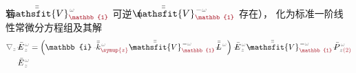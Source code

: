 若 $\Xint{\mathcolor{gray}{-}}{25}{\bar{\bar{\mathsfit{V}}}}^{\;\! \mathcolor{gray}{\omega}}_{\textcolor{Maroon}{\mathbb{1}}}$ 可逆（ $\Xint{\mathcolor{gray}{-}}{25}{\bar{\bar{\mathsfit{V}}}}^{\;\! - \mathcolor{gray}{\omega}}_{\textcolor{Maroon}{\mathbb{1}}}$ 存在）， 化为标准一阶线性常微分方程组及其解
\begin{align}
	\mathcolor{gray}{\nabla_z} \Xint{\mathcolor{gray}{-}}{295}{\bar{E}}^{\;\!\mathcolor{gray}{\omega}}_{\;\! \mathcolor{gray}{z}}
	&= \left( \mathbb{i} \Xint{\begin{smallmatrix} ~ \\ {}^{}_{\mathcolor{gray}{-}} \\ ~ \end{smallmatrix}}{15}{\bar{\bar{k}}}_{\textcolor{Maroon}{\symup{z}}}^{\;\! \mathcolor{gray}{\omega}} - \Xint{\mathcolor{gray}{-}}{25}{\bar{\bar{\mathsfit{V}}}}^{\;\! - \mathcolor{gray}{\omega}}_{\textcolor{Maroon}{\mathbb{1}}} \Xint{\mathcolor{gray}{-}}{32}{\bar{\bar{L}}}^{\;\! \mathcolor{gray}{\omega}} \right) \Xint{\mathcolor{gray}{-}}{295}{\bar{E}}^{\;\!\mathcolor{gray}{\omega}}_{\;\! \mathcolor{gray}{z}} - \Xint{\mathcolor{gray}{-}}{25}{\bar{\bar{\mathsfit{V}}}}^{\;\! - \mathcolor{gray}{\omega}}_{\textcolor{Maroon}{\mathbb{1}}} \Xint{\mathcolor{gray}{-}}{30}{\bar{P}}^{\;\! \mathcolor{gray}{\omega}}_{\;\! \mathcolor{gray}{z} \textcolor{Maroon}{(2)}} \label{eq:simplify6-SVA-E'-V_1nonsingular} \\
	\Xint{\mathcolor{gray}{-}}{295}{\bar{E}}^{\;\!\mathcolor{gray}{\omega}}_{\;\! \mathcolor{gray}{z}}

\end{align}
